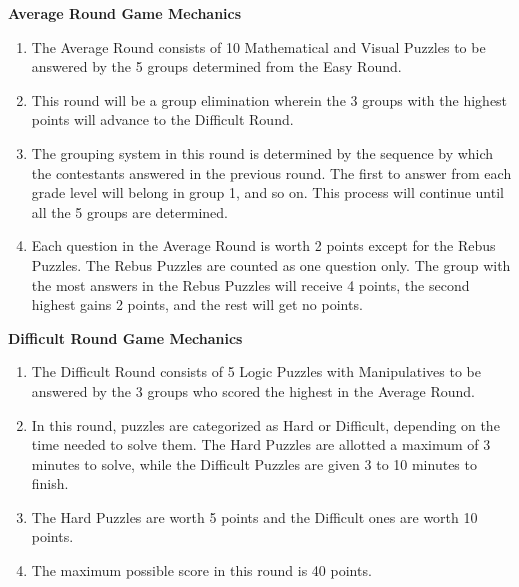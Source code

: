 \documentclass[11pt]{article}
\begin{document}
\textbf{Average Round Game Mechanics} 
\begin{enumerate}[label = \arabic*. ]
\item The Average Round consists of 10 Mathematical and Visual Puzzles to be answered by the 5 groups determined from the Easy Round. 
\item This round will be a group elimination wherein the 3 groups with the highest points will advance to the Difficult Round. 
\item The grouping system in this round is determined by the sequence by which the contestants answered in the previous round. The first to answer from each grade level will belong in group 1, and so on. This process will continue until all the 5 groups are determined. 
\item Each question in the Average Round is worth 2 points except for the Rebus Puzzles. The Rebus Puzzles are counted as one question only. The group with the most answers in the Rebus Puzzles will receive 4 points, the second highest gains 2 points, and the rest will get no points. 
\end{enumerate} 

\textbf{Difficult Round Game Mechanics} 
\begin{enumerate}[label = \arabic*. ]
\item The Difficult Round consists of 5 Logic Puzzles with Manipulatives to be answered by the 3 groups who scored the highest in the Average Round. 
\item In this round, puzzles are categorized as Hard or Difficult, depending on the time needed to solve them. The Hard Puzzles are allotted a maximum of 3 minutes to solve, while the Difficult Puzzles are given 3 to 10 minutes to finish. 
\item The Hard Puzzles are worth 5 points and the Difficult ones are worth 10 points. 
\item The maximum possible score in this round is 40 points. 
\end{enumerate} 
\end{document}
